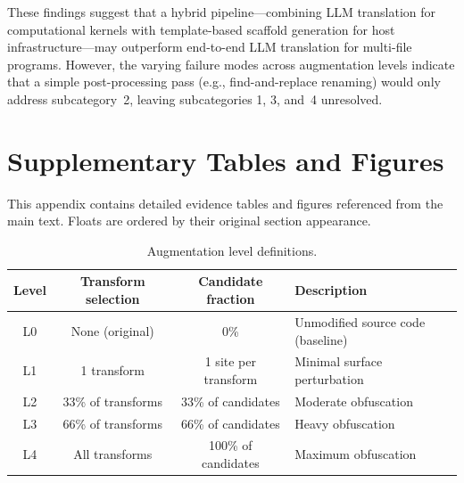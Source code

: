 These findings suggest that a hybrid pipeline---combining LLM translation for
computational kernels with template-based scaffold generation for host
infrastructure---may outperform end-to-end LLM translation for multi-file
programs. However, the varying failure modes across augmentation levels indicate
that a simple post-processing pass (e.g., find-and-replace renaming) would only
address subcategory~2, leaving subcategories 1, 3, and~4 unresolved.


\section{Supplementary Tables and Figures}
\label{sec:appendix-d}

This appendix contains detailed evidence tables and figures referenced from the main text.
Floats are ordered by their original section appearance.



\begin{table}[htbp]
\centering
\caption{Augmentation level definitions.}
\label{tab:augmentation-levels}
\small
\begin{tabular}{@{}cccp{3.8cm}@{}}
\toprule
Level & Transform selection & Candidate fraction & Description \\
\midrule
L0 & None (original) & 0\% & Unmodified source code (baseline) \\
L1 & 1 transform & 1 site per transform & Minimal surface perturbation \\
L2 & 33\% of transforms & 33\% of candidates & Moderate obfuscation \\
L3 & 66\% of transforms & 66\% of candidates & Heavy obfuscation \\
L4 & All transforms & 100\% of candidates & Maximum obfuscation \\
\bottomrule
\end{tabular}
\end{table}

